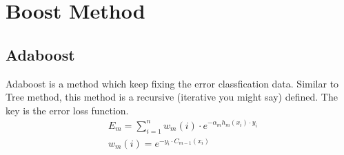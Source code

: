 \section{Boost Method}
\subsection{Adaboost}

Adaboost is a method which keep fixing the error classfication data. Similar to Tree method, this method is a recursive (iterative you might say) defined. The key is the error loss function.
\begin{equation}
\begin{aligned}
  &E_m = \sum_{i=1}^{n}w_m(i) \cdot e^{-\alpha_m h_m(x_i) \cdot y_i}\\
  &w_m(i) = e^{-y_i \cdot C_{m-1}(x_i)}
\end{aligned}
\end{equation}
